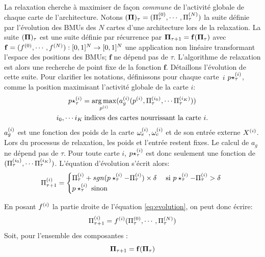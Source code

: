 La relaxation cherche à maximiser de façon \emph{commune} de l'activité globale de chaque carte de l'architecture. Notons $(\mathbf{\Pi})_\tau = (\Pi^{({0})}_\tau,\cdots,\Pi^{({N})}_\tau)$ la suite définie par l'évolution des BMUs des $N$ cartes d'une architecture lors de la relaxation.
La suite $(\mathbf{\Pi})_\tau$ est une suite définie par récurrence par $\mathbf{\Pi}_{\tau+1} = \mathbf{f}(\mathbf{\Pi}_\tau)$
avec $\mathbf{f} = (f^{({0})},\cdots,f^{({N})}) : [0,1]^N \rightarrow [0,1]^N$ une application non linéaire transformant l'espace des positions des BMUs; $\mathbf{f}$ ne dépend pas de $\tau$. L'algorithme de relaxation est alors une recherche de point fixe de la fonction $\mathbf{f}$.
Détaillons l'évolution de cette suite. Pour clarifier les notations, définissons pour chaque carte~$i$ $p\star^{({i})}_\tau$, comme la position maximisant l'activité globale de la carte $i$:
\begin{equation}
\begin{gathered}
p\star^{({i})}_{\tau} = \operatorname*{arg\,max}_{p^{({i})}}(a_g^{({i})}(p^{({i})},\Pi^{({i_0})}_\tau, \cdots \Pi^{({i_K})}_\tau))\\
 i_0, \cdots i_K \: \text{indices des cartes nourrissant la carte $i$}.
\end{gathered}
\label{eq:pstar}
\end{equation}
$a_g^{({i})}$ est une fonction des poids de la carte $\omega_{e}^{({i})}, \omega_{c}^{({i})}$ et de son entrée externe $X^{({i})}$. Lors du processus de relaxation, les poids et l'entrée restent fixes. Le calcul de $a_g$ ne dépend pas de $\tau$. Pour toute carte $i$, $p\star^{({i})}_{\tau}$ est donc seulement une fonction de $(\Pi^{({i_0})}_\tau, \cdots \Pi^{({i_K})}_\tau)$.
L'équation d'évolution s'écrit alors: 
\begin{equation}
\Pi^{({i})}_{\tau+1} = 
\begin{cases}
\Pi^{({i})}_{\tau} + sgn(p\star^{({i})}_{\tau} - \Pi^{({i})}_{\tau}) \times \delta \; & \text{si $p\star^{({i})}_{\tau} - \Pi^{({i})}_{\tau} > \delta$ } \\
p\star^{({i})}_{\tau} \; \text{sinon}	
\end{cases}
\label{eq:evolution}
\end{equation}

En posant $f^{({i})}$ la partie droite de l'équation \ref{eq:evolution}, on peut donc écrire: 
\begin{equation}
\Pi^{({i})}_{\tau +1} = f^{({i})}(\Pi^{({0})}_\tau,\cdots,\Pi^{({N})}_\tau)
\label{eq:fonction}
\end{equation}
Soit, pour l'ensemble des composantes : 
\begin{equation}
\mathbf{\Pi}_{\tau+1} = \mathbf{f}(\mathbf{\Pi}_\tau)
\end{equation}

